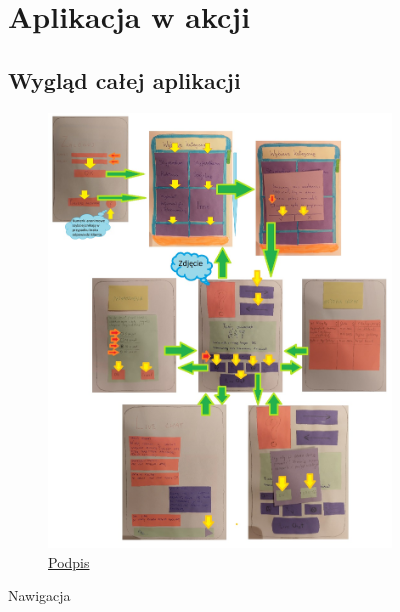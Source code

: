 \documentclass[12pt]{article}
\begin{document}
\clearpage


\begin{figure}[h!]
	\section {Aplikacja w akcji}
	\subsection{Wygląd całej aplikacji}
	\centering
	\begin{subfigure}[b]{1\linewidth}
		\includegraphics[width=\linewidth]{zdj/mozaika.jpg}
		\caption{\underline{Podpis}}
	\end{subfigure}
	\label{fig:nuty}
	\caption{Nawigacja}
\end{figure}

\clearpage
\end{document}
